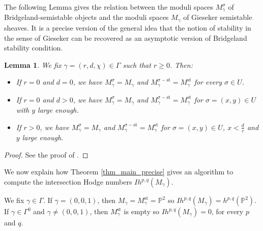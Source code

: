 \documentclass[12pt, a4paper]{amsart}
\newtheorem{lem}[defn]{Lemma}
\newcommand\PP{\mathbb P}
\newcommand\st{\mathrm{st}}
\begin{document}
The following Lemma
gives the relation between the 
moduli spaces $M_\gamma^\sigma$ of Bridgeland-semistable objects 
and the moduli spaces $M_\gamma$ of Gieseker semistable
sheaves. It is a precise version of the general idea that 
the notion of stability in the sense of Gieseker can be recovered as an asymptotic version
of Bridgeland stability condition.

\begin{lem} \label{lem_comparison_bridgeland_gieseker}
We fix $\gamma=(r,d,\chi)\in \Gamma$
such that $r \geqslant 0$.
Then:
\begin{itemize}
\item[(i)] If $r=0$ and $d=0$, we have $M_\gamma^{\sigma}=M_\gamma$
and $M_\gamma^{\sigma-\st}=M_\gamma^\st$ for every $\sigma \in U$.
\item[(ii)] If $r=0$ and $d>0$, we have $M_\gamma^{\sigma}
=M_\gamma$ and $M_\gamma^{\sigma-\st}=M_\gamma^\st$ for $\sigma=(x,y) \in U$ with $y$ large enough.
\item[(iii)] If $r>0$, we have  
$M_\gamma^{\sigma}=M_\gamma$ and $M_\gamma^{\sigma-\st}=M_\gamma^\st$ for 
$\sigma=(x,y) \in U$, 
$x < \frac{d}{r}$ and $y$ large enough.
\end{itemize}
\end{lem}

\begin{proof}
See the proof of \cite[Proposition 6.2]{MR3010070}.
\end{proof}

We now explain how Theorem \ref{thm_main_precise} gives an algorithm to compute the intersection Hodge numbers $Ih^{p,q}(M_\gamma)$. 


We fix $\gamma \in \Gamma$. 
If $\gamma =(0,0,1)$, then $M_\gamma=M_\gamma^\st=\PP^2$
so $Ih^{p,q}(M_\gamma)=h^{p,q}(\PP^2)$. If $\gamma \in \Gamma^0$
and $\gamma \neq (0,0,1)$, then $M_\gamma^\st$ is empty so $Ih^{p,q}(M_\gamma)=0$, for every $p$ and $q$.
\end{document}
